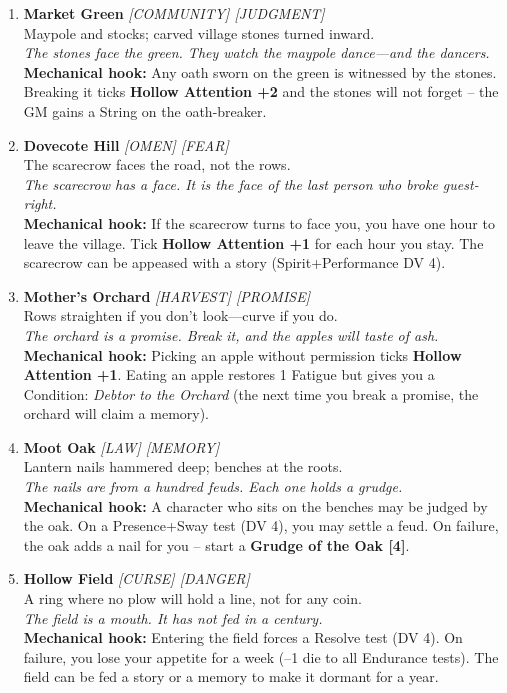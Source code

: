 \begin{enumerate}
\item \textbf{Market Green} \hfill \textit{[COMMUNITY] [JUDGMENT]} \\
  Maypole and stocks; carved village stones turned inward. \\
  \textit{The stones face the green. They watch the maypole dance---and the dancers.} \\
  \textbf{Mechanical hook:} Any oath sworn on the green is witnessed by the stones. Breaking it ticks \textbf{Hollow Attention +2} and the stones will not forget -- the GM gains a String on the oath-breaker.

\item[J] \textbf{Dovecote Hill} \hfill \textit{[OMEN] [FEAR]} \\
  The scarecrow faces the road, not the rows. \\
  \textit{The scarecrow has a face. It is the face of the last person who broke guest-right.} \\
  \textbf{Mechanical hook:} If the scarecrow turns to face you, you have one hour to leave the village. Tick \textbf{Hollow Attention +1} for each hour you stay. The scarecrow can be appeased with a story (Spirit+Performance DV 4).

\item[Q] \textbf{Mother's Orchard} \hfill \textit{[HARVEST] [PROMISE]} \\
  Rows straighten if you don't look---curve if you do. \\
  \textit{The orchard is a promise. Break it, and the apples will taste of ash.} \\
  \textbf{Mechanical hook:} Picking an apple without permission ticks \textbf{Hollow Attention +1}. Eating an apple restores 1 Fatigue but gives you a Condition: \textit{Debtor to the Orchard} (the next time you break a promise, the orchard will claim a memory).

\item[K] \textbf{Moot Oak} \hfill \textit{[LAW] [MEMORY]} \\
  Lantern nails hammered deep; benches at the roots. \\
  \textit{The nails are from a hundred feuds. Each one holds a grudge.} \\
  \textbf{Mechanical hook:} A character who sits on the benches may be judged by the oak. On a Presence+Sway test (DV 4), you may settle a feud. On failure, the oak adds a nail for you -- start a \textbf{Grudge of the Oak [4]}.

\item[A] \textbf{Hollow Field} \hfill \textit{[CURSE] [DANGER]} \\
  A ring where no plow will hold a line, not for any coin. \\
  \textit{The field is a mouth. It has not fed in a century.} \\
  \textbf{Mechanical hook:} Entering the field forces a Resolve test (DV 4). On failure, you lose your appetite for a week (--1 die to all Endurance tests). The field can be fed a story or a memory to make it dormant for a year.
\end{enumerate}

